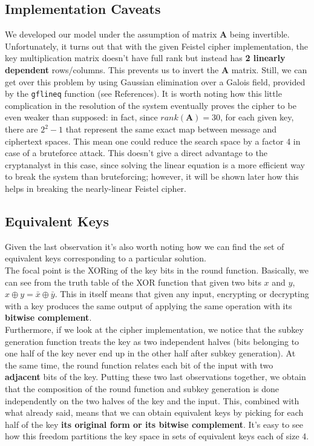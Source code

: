 \documentclass[a4paper,12pt,titlepage]{article}
\begin{document}
\subsection*{Implementation Caveats}
We developed our model under the assumption of matrix $\mathbf{A}$
being invertible. Unfortunately, it turns out that with the given Feistel cipher
implementation, the key multiplication matrix doesn't have full rank but
instead has \textbf{2 linearly dependent} rows/columns. This prevents us to invert
the $\mathbf{A}$ matrix. Still, we can get over this problem by using Gaussian
elimination over a Galois field, provided by the \texttt{gflineq} function (see
References).
It is worth noting how this little complication in the resolution of the
system eventually proves the cipher to be even weaker than supposed: in fact,
since $rank(\mathbf{A}) = 30$, for each given key, there are $2^2-1$ that
represent the same exact map between message and ciphertext spaces. This mean
one could reduce the search space by a factor 4 in case of a bruteforce attack.
This doesn't give a direct advantage to the cryptanalyst
in this case, since solving the linear equation is a more efficient way to
break the system than bruteforcing; however, it will be shown later how this helps in breaking
the nearly-linear Feistel cipher.

\subsection*{Equivalent Keys}
Given the last observation it's also worth noting how we can find the set of
equivalent keys corresponding to a particular solution. \\
The focal point is the XORing of the key bits in the round function. Basically,
we can see from the truth table of the XOR function that given two bits $x$
and $y$, $x \oplus y = \bar{x} \oplus \bar{y}$. This in itself means that given
any input, encrypting or decrypting with a key produces the same output of
applying the same operation with its \textbf{bitwise complement}. \\
Furthermore, if we look at the cipher implementation, we notice that the subkey generation
function treats the key as two independent halves (bits belonging to one half
of the key never end up in the other half after subkey generation). At the same
time, the round function relates each bit of the input with two
\textbf{adjacent} bits of the key. Putting these two last observations
together, we obtain that the composition of the round function and subkey
generation is done independently on the two halves of the key and the input.
This, combined with what already said, means that we can obtain equivalent keys
by picking for each half of the key \textbf{its original form or its bitwise
complement}. It's easy to see how this freedom partitions the key space in sets of
equivalent keys each of size 4.
\end{document}
